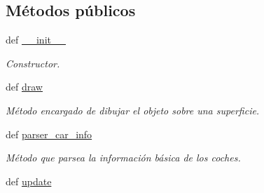 \subsection*{\-Métodos públicos}
\begin{DoxyCompactItemize}
\item 
def \hyperlink{classengine_1_1basiccar_1_1BasicCar_a75d84f87f6ef7ab35f17be4f40470a55}{\-\_\-\-\_\-init\-\_\-\-\_\-}
\begin{DoxyCompactList}\small\item\em \-Constructor. \end{DoxyCompactList}\item 
def \hyperlink{classengine_1_1basiccar_1_1BasicCar_a9a25de0552f17acee569a4c2176908f8}{draw}
\begin{DoxyCompactList}\small\item\em \-Método encargado de dibujar el objeto sobre una superficie. \end{DoxyCompactList}\item 
\hypertarget{classengine_1_1basiccar_1_1BasicCar_aa0e5a272f37e6e1a323bc4f51bbc8a5a}{
def \hyperlink{classengine_1_1basiccar_1_1BasicCar_aa0e5a272f37e6e1a323bc4f51bbc8a5a}{parser\-\_\-car\-\_\-info}}
\label{classengine_1_1basiccar_1_1BasicCar_aa0e5a272f37e6e1a323bc4f51bbc8a5a}

\begin{DoxyCompactList}\small\item\em \-Método que parsea la información básica de los coches. \end{DoxyCompactList}\item 
\hypertarget{classengine_1_1basiccar_1_1BasicCar_af7aac21dcba32b080a07e970ada07f32}{
def \hyperlink{classengine_1_1basiccar_1_1BasicCar_af7aac21dcba32b080a07e970ada07f32}{update}}
\label{classengine_1_1basiccar_1_1BasicCar_af7aac21dcba32b080a07e970ada07f32}


\end{DoxyCompactItemize}
